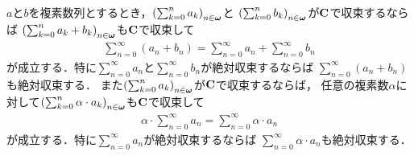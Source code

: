 	\begin{screen}
		\begin{thm}[収束する級数の線型性]
		\label{thm:linearity_of_convergent_series}
			$a$と$b$を複素数列とするとき，$\left(\sum_{k=0}^{n} a_{k}\right)_{n \in {\boldsymbol \omega}}$と
			$\left(\sum_{k=0}^{n} b_{k}\right)_{n \in {\boldsymbol \omega}}$が$\mathbf{C}$で収束するならば
			$\left(\sum_{k=0}^{n} a_{k}+b_{k}\right)_{n \in {\boldsymbol \omega}}$も$\mathbf{C}$で収束して
			\begin{align}
				\sum_{n=0}^{\infty} (a_{n} + b_{n}) = \sum_{n=0}^\infty a_n + \sum_{n=0}^\infty b_n
			\end{align}
			が成立する．特に$\sum_{n=0}^\infty a_n$と$\sum_{n=0}^\infty b_n$が絶対収束するならば
			$\sum_{n=0}^\infty (a_n + b_n)$も絶対収束する．
			また$\left(\sum_{k=0}^{n} a_{k}\right)_{n \in {\boldsymbol \omega}}$が$\mathbf{C}$で収束するならば，
			任意の複素数$\alpha$に対して$\left(\sum_{k=0}^{n} \alpha \cdot a_{k}\right)_{n \in {\boldsymbol \omega}}$も$\mathbf{C}$で収束して
			\begin{align}
				\alpha \cdot \sum_{n=0}^\infty a_n = \sum_{n=0}^\infty \alpha \cdot a_n
			\end{align}
			が成立する．特に$\sum_{n=0}^\infty a_n$が絶対収束するならば
			$\sum_{n=0}^\infty \alpha \cdot a_n$も絶対収束する．
		\end{thm}
	\end{screen}
	
